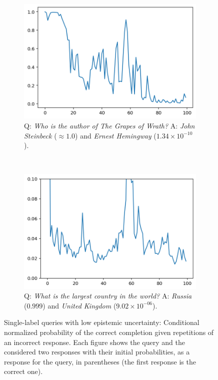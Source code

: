 \documentclass[a4paper]{article}
\theoremstyle{plain}
\theoremstyle{definition}
\theoremstyle{plain}
\begin{document}
\begin{figure}[t]
\begin{center}
\begin{subfigure}[t]{0.23\linewidth}
    \includegraphics[width=\textwidth]{prob_JS.png}
    \caption*{\tiny Q: \emph{Who is the author of The Grapes of Wrath?} A: \emph{John Steinbeck} ($\approx 1.0$) and \emph{Ernest Hemingway} ($1.34 \times 10^{-10}$).}
  \end{subfigure}
  ~~
  \begin{subfigure}[t]{0.23\linewidth}
    \includegraphics[width=\textwidth]{prob_Russia.png}
    \caption*{\tiny Q: \emph{What is the largest country in the world?} A: \emph{Russia} ($0.999$) and \emph{United Kingdom} ($9.02 \times 10^{-06}$).}
  \end{subfigure}
\end{center}
\vspace{-4mm}
\caption{Single-label queries with low epistemic uncertainty:
    Conditional normalized probability of the correct completion given repetitions of an incorrect response. Each figure shows the query and the considered two responses with their initial probabilities, as a response for the query, in parentheses (the first response is the correct one).}
\label{fig:single-label-no-hallucination}


\end{figure}
\end{document}
